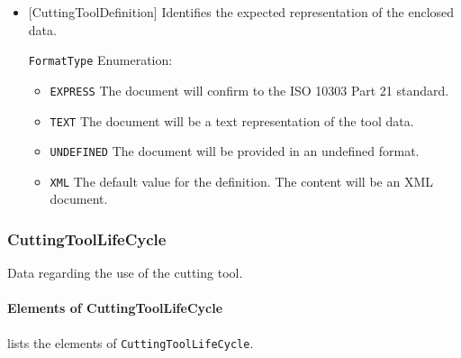 \begin{itemize}

\item {}[CuttingToolDefinition] \newline Identifies the expected representation of the enclosed data.

\texttt{FormatType} Enumeration:

\begin{itemize}
\item \texttt{EXPRESS} \newline The document will confirm to the ISO 10303 Part 21 standard.
 
\item \texttt{TEXT} \newline The document will be a text representation of the tool data.
 
\item \texttt{UNDEFINED} \newline The document will be provided in an undefined format. 
\item \texttt{XML} \newline The default value for the definition. The content will be an XML document. 
\end{itemize}

\end{itemize}

\subsubsection{CuttingToolLifeCycle}
\label{sec:CuttingToolLifeCycle}



Data regarding the use of the cutting tool.


\paragraph{Elements of CuttingToolLifeCycle}\mbox{}
\label{sec:Elements of CuttingToolLifeCycle}

 lists the elements of \texttt{CuttingToolLifeCycle}.

